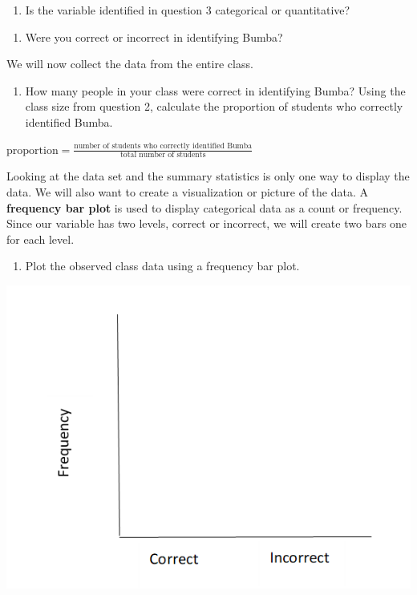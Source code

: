 \documentclass[
]{report}
\providecommand{\tightlist}{%
  \setlength{\itemsep}{0pt}\setlength{\parskip}{0pt}}
\begin{document}
\begin{enumerate}
\def\labelenumi{\arabic{enumi}.}
\setcounter{enumi}{3}
\tightlist
\item
  Is the variable identified in question 3 categorical or quantitative?
\end{enumerate}

\vspace{0.3in}

\begin{enumerate}
\def\labelenumi{\arabic{enumi}.}
\setcounter{enumi}{4}
\tightlist
\item
  Were you correct or incorrect in identifying Bumba?
\end{enumerate}

\vspace{0.3in}

We will now collect the data from the entire class.

\begin{enumerate}
\def\labelenumi{\arabic{enumi}.}
\setcounter{enumi}{5}
\tightlist
\item
  How many people in your class were correct in identifying Bumba? Using the class size from question 2, calculate the proportion of students who correctly identified Bumba.
\end{enumerate}

\begin{center}
$\mbox{proportion} = \frac{\mbox{number of students who correctly identified Bumba}}{\mbox{total number of students}}$
\end{center}

\newpage

Looking at the data set and the summary statistics is only one way to display the data. We will also want to create a visualization or picture of the data. A \textbf{frequency bar plot} is used to display categorical data as a count or frequency. Since our variable has two levels, correct or incorrect, we will create two bars one for each level.

\begin{enumerate}
\def\labelenumi{\arabic{enumi}.}
\setcounter{enumi}{6}
\tightlist
\item
  Plot the observed class data using a frequency bar plot.
\end{enumerate}

\begin{flushleft}\includegraphics[width=0.75\linewidth]{images/barplot_martian} \end{flushleft}
\end{document}
